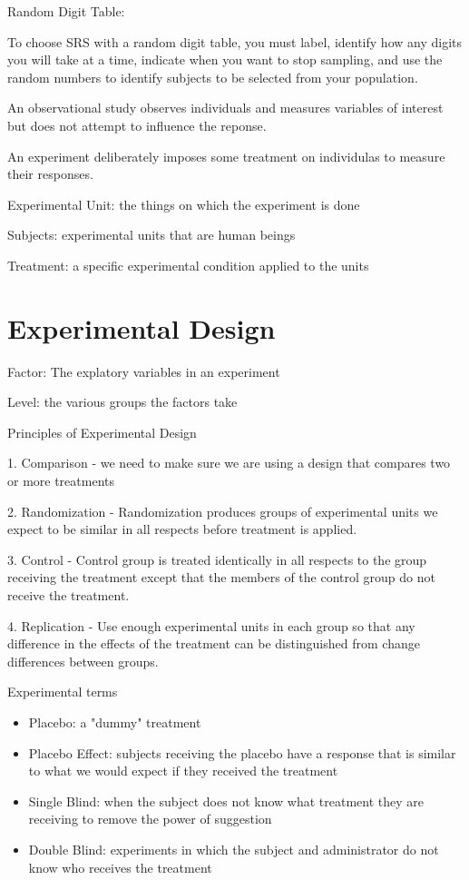 \documentclass[../stats.tex]{subfiles}
\begin{document}
Random Digit Table:

To choose SRS with a random digit table, you must label, identify how any digits you will take at a time, indicate when you want to stop sampling, and use the random numbers to identify subjects to be selected from your population.

An observational study observes individuals and measures variables of interest but does not attempt to influence the reponse.

An experiment deliberately imposes some treatment on individulas to measure their responses.

Experimental Unit: the things on which the experiment is done 

Subjects: experimental units that are human beings 

Treatment: a specific experimental condition applied to the units
\section{Experimental Design}
Factor: The explatory variables in an experiment 

Level: the various groups the factors take

Principles of Experimental Design 

1. Comparison - we need to make sure we are using a design that compares two or more treatments 

2. Randomization - Randomization produces groups of experimental units we expect to be similar in all respects before treatment 
is applied. 

3. Control - Control group is treated identically in all respects to the group receiving the treatment except that the members of the control group do not receive the treatment.

4. Replication - Use enough experimental units in each group so that any difference in the effects of the treatment can be distinguished from change differences between groups.

Experimental terms
\begin{itemize}
    \item Placebo: a "dummy" treatment 
    \item Placebo Effect: subjects receiving the placebo have a response that is similar to what we would expect if they received the treatment 
    \item Single Blind: when the subject does not know what treatment they are receiving to remove the power of suggestion
    \item Double Blind: experiments in which the subject and administrator do not know who receives the treatment 
\end{itemize}
\end{document}
